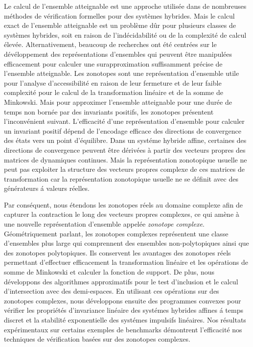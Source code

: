 Le calcul de l'ensemble atteignable est une approche 
utilis\'ee dans de nombreuses m\'ethodes de v\'erification formelles pour
des syst\`emes hybrides. Mais le calcul exact de l'ensemble atteignable
est un probl\`eme d\^ur pour plusieurs classes de syst\`emes
hybrides, soit en raison de l'ind\'ecidabilit\'e ou de la complexit\'e de
calcul \'elev\'ee. Alternativement, beaucoup de recherches ont \'et\'e centr\'ees
sur le d\'ev\'eloppement des repr\'esentations d'ensembles qui peuvent \^etre
manipul\'ees efficacement pour calculer une surapproximation suffisamment
pr\'ecise de l'ensemble atteignable. Les zonotopes sont une
repr\'esentation d'ensemble utile pour l'analyse d'accessibilit\'e
en raison de leur fermeture et de leur faible complexit\'e pour le
calcul de la transformation lin\'eaire et de la somme de
Minkowski. Mais pour approximer l'ensemble atteignable pour une dur\'ee de temps non born\'ee
par des invariants positifs, les zonotopes pr\'esentent
l'inconv\'enient suivant. L'efficacit\'e d'une repr\'esentation d'ensemble
pour calculer un invariant positif d\'epend de l'encodage efficace des
directions de convergence des \'etats vers un point d'\'equilibre. Dans un syst\'eme
hybride affine, certaines des directions de convergence peuvent \^etre
d\'eriv\'ees \`a partir des vecteurs propres des matrices de
dynamiques continues. Mais la repr\'esentation zonotopique usuelle ne peut pas
exploiter la structure des vecteurs propres complexe de ces matrices de transformation
car la repr\'esentation zonotopique usuelle ne se d\'efinit avec des g\'en\'erateurs \'a valeurs r\'eelles.

Par cons\'equent, nous \'etendons les zonotopes r\'eels au domaine 
complexe afin de capturer la contraction le long des
vecteurs propres complexes, ce qui am\`ene \`a une nouvelle repr\'esentation
d'ensemble appel\'ee {\em zonotope complexe}. G\'eom\'etriquement parlant, les zonotopes
complexes repr\'esentent une classe d'ensembles plus large qui
comprennent des ensembles non-polytopiques ainsi que des zonotopes
polytopiques. Ils conservent les avantages des zonotopes r\'eels permettant
d'effectuer efficacement la transformation lin\'eaire et les
op\'erations de somme de Minkowski et calculer la fonction de
support. De plus, nous d\'eveloppons des
algorithmes approximatifs pour le test d'inclusion
et le calcul d'intersection avec des demi-espaces. En utilisant ces op\'erations
sur des zonotopes complexes, nous d\'eveloppons ensuite des programmes convexes
pour v\'erifier les propri\'et\'es d'invariance lin\'eaire des syst\'emes
hybrides affines \'a temps discret et la stabilit\'e exponentielle des
syst\'emes impulsifs lin\'eaires. Nos r\'esultats exp\'erimentaux sur certains exemples de
benchmarks d\'emontrent l'efficacit\'e nos techniques de v\'erification
bas\'ees sur des zonotopes complexes.
